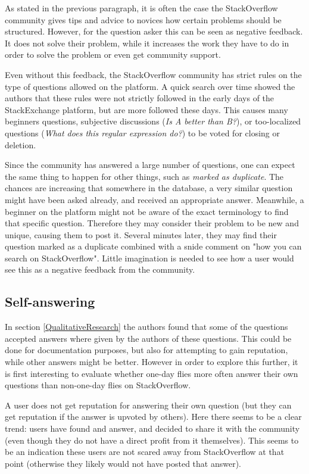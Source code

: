 \documentclass[conference]{IEEEtran}
\begin{document}
As stated in the previous paragraph, it is often the case the StackOverflow
community gives tips and advice to novices how certain problems should be
structured. However, for the question asker this can be seen as negative
feedback. It does not solve their problem, while it increases the work they
have to do in order to solve the problem or even get community support.

Even without this feedback, the StackOverflow community has strict rules on the
type of questions allowed on the platform. A quick search over time showed the
authors that these rules were not strictly followed in the early days of the
StackExchange platform, but are more followed these days. This causes many
beginners questions, subjective discussions (\textit{Is A better than B?}), or
too-localized questions (\textit{What does this regular expression do?}) to be
voted for closing or deletion.

Since the community has answered a large number of questions, one can expect
the same thing to happen for other things, such as \textit{marked as
duplicate}. The chances are increasing that somewhere in the database, a very
similar question might have been asked already, and received an appropriate
answer. Meanwhile, a beginner on the platform might not be aware of the exact
terminology to find that specific question. Therefore they may consider their
problem to be new and unique, causing them to post it. Several minutes later,
they may find their question marked as a duplicate combined with a snide
comment on "how you can search on StackOverflow". Little imagination is needed
to see how a user would see this as a negative feedback from the community.


\subsection{Self-answering}
In section \ref{QualitativeResearch}  the authors found that some of the
questions accepted answers where given by the authors of these questions. This
could be done for documentation purposes, but also for attempting to gain
reputation, while other answers might be better. However in order to explore
this further, it is first interesting to evaluate whether one-day flies more
often answer their own questions than non-one-day flies on StackOverflow.

A user does not get reputation for answering their own question (but they can
get reputation if the answer is upvoted by others). Here there seems to be a
clear trend: users have found and answer, and decided to share it with the
community (even though they do not have a direct profit from it themselves).
This seems to be an indication these users are not scared away from
StackOverflow at that point (otherwise they likely would not have posted that
answer). 
\end{document}
